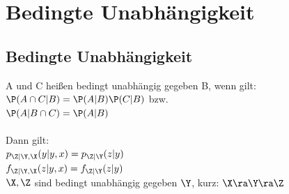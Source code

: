 \documentclass[german,color,6pt]{latex4ei/latex4ei_sheet}
\begin{document}
\section{Bedingte Unabhängigkeit}
\label{bed-unabh}
\begin{sectionbox}
	\subsection{Bedingte Unabhängigkeit}
	A und C heißen bedingt unabhängig gegeben B, wenn gilt:\\
	$\P(A \cap C | B) = \P(A | B)\P(C| B)$	bzw.\\
	$\P(A | B \cap C) = \P(A | B)$ \\ \\
	Dann gilt: \\
	$p_{\Z|\Y,\X}(y|y,x) = p_{\Z|\Y}(z|y)$ \\
	$f_{\Z|\Y,\X}(z|y,x) = f_{\Z|\Y}(z|y)$ \\
	$\X,\Z$ sind bedingt unabhängig gegeben $\Y$, kurz: $\X \ra \Y \ra \Z$
\end{sectionbox}

\vfill
\end{document}
